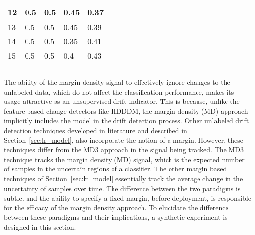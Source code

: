 \documentclass[authoryear,3p,times,twocolumn]{elsarticle}
\begin{document}
\begin{table}[t]
\begin{tabular}{lllll}
\multicolumn{1}{|l|}{12} & \multicolumn{1}{l|}{\textbf{0.5}} & \multicolumn{1}{l|}{0.5} & \multicolumn{1}{l|}{0.45} & \multicolumn{1}{l|}{0.37} \\ \hline
\multicolumn{1}{|l|}{13} & \multicolumn{1}{l|}{0.5} & \multicolumn{1}{l|}{0.5} & \multicolumn{1}{l|}{0.45} & \multicolumn{1}{l|}{0.39} \\ \hline
\multicolumn{1}{|l|}{14} & \multicolumn{1}{l|}{0.5} & \multicolumn{1}{l|}{0.5} & \multicolumn{1}{l|}{0.35} & \multicolumn{1}{l|}{0.41} \\ \hline
\multicolumn{1}{|l|}{15} & \multicolumn{1}{l|}{0.5} & \multicolumn{1}{l|}{0.5} & \multicolumn{1}{l|}{0.4} & \multicolumn{1}{l|}{0.43} \\ \hline
 &  &  &  &  \\
 &  &  &  & 
\end{tabular}
\end{table}

The ability of the margin density signal to effectively ignore changes to the unlabeled data, which do not affect the classification performance, makes its usage attractive as an unsupervised drift indicator. This is because, unlike the feature based change detectors like HDDDM, the margin density (MD) approach implicitly includes the model in the drift detection process. Other unlabeled drift detection techniques developed in literature \citep{dries2009adaptive,lindstrom2013drift,dredze2010we,zliobaite2010change}
 and described in Section~\ref{sec:lr_model}, also incorporate the notion of a margin. However, these techniques differ from the MD3 approach in the signal being tracked. The MD3 technique tracks the margin density (MD) signal, which is the expected number of samples in the uncertain regions of a classifier. The other margin based techniques of Section~\ref{sec:lr_model} essentially track the average change in the uncertainty of samples over time. The difference between the two paradigms is subtle, and the ability to specify a fixed margin, before deployment, is responsible for the efficacy of the margin density approach. To elucidate the difference between these paradigms and their implications, a synthetic experiment is designed in this section. 
\end{document}
